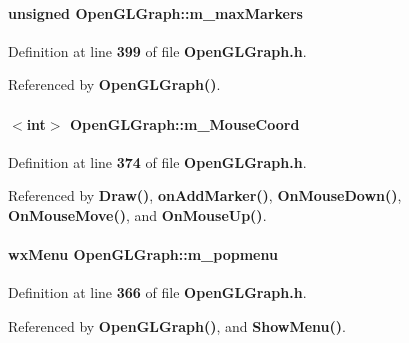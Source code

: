 \paragraph[{m\+\_\+max\+Markers}]{\setlength{\rightskip}{0pt plus 5cm}unsigned Open\+G\+L\+Graph\+::m\+\_\+max\+Markers\hspace{0.3cm}{\ttfamily [private]}}\label{classOpenGLGraph_ad381c17ce81d93d2c6218619f22ef6fc}


Definition at line {\bf 399} of file {\bf Open\+G\+L\+Graph.\+h}.



Referenced by {\bf Open\+G\+L\+Graph()}.

\paragraph[{m\+\_\+\+Mouse\+Coord}]{$<${\bf int}$>$ Open\+G\+L\+Graph\+::m\+\_\+\+Mouse\+Coord\hspace{0.3cm}{\ttfamily [private]}}\label{classOpenGLGraph_a4b3535d19f44d9e722103f28424fa064}


Definition at line {\bf 374} of file {\bf Open\+G\+L\+Graph.\+h}.



Referenced by {\bf Draw()}, {\bf on\+Add\+Marker()}, {\bf On\+Mouse\+Down()}, {\bf On\+Mouse\+Move()}, and {\bf On\+Mouse\+Up()}.

\paragraph[{m\+\_\+popmenu}]{\setlength{\rightskip}{0pt plus 5cm}wx\+Menu Open\+G\+L\+Graph\+::m\+\_\+popmenu\hspace{0.3cm}{\ttfamily [private]}}\label{classOpenGLGraph_a681da2eb0e0b94465572f19a81fb2ad4}


Definition at line {\bf 366} of file {\bf Open\+G\+L\+Graph.\+h}.



Referenced by {\bf Open\+G\+L\+Graph()}, and {\bf Show\+Menu()}.

